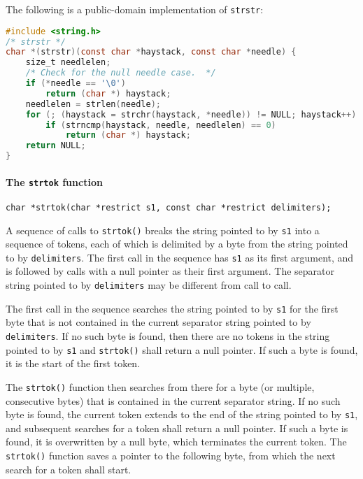 The following is a public-domain implementation of \texttt{strstr}:
\lstset{basicstyle=\scriptsize, numbers=left, captionpos=b, tabsize=4}
\begin{lstlisting}[caption=Section \thesection listing \arabic{stringcnt},language={C},
breaklines=true,xleftmargin=15pt,label=lst:section\thesection listing\arabic{stringcnt}]
#include <string.h>
/* strstr */
char *(strstr)(const char *haystack, const char *needle) {
	size_t needlelen;
	/* Check for the null needle case.  */
	if (*needle == '\0')
		return (char *) haystack;
	needlelen = strlen(needle);
	for (; (haystack = strchr(haystack, *needle)) != NULL; haystack++)
		if (strncmp(haystack, needle, needlelen) == 0)
			return (char *) haystack;
	return NULL;
}
\end{lstlisting}

\paragraph{The \texttt{strtok} function}
\texttt{char *strtok(char *restrict s1, const char *restrict delimiters);}

A sequence of calls to \texttt{strtok()} breaks the string pointed to by
\texttt{s1} into a sequence of tokens, each of which is delimited by a byte
from the string pointed to by \texttt{delimiters}. The first call in the
sequence has \texttt{s1} as its first argument, and is followed by calls with a
null pointer as their first argument. The separator string pointed to by
\texttt{delimiters} may be different from call to call.

The first call in the sequence searches the string pointed to by \texttt{s1}
for the first byte that is not contained in the current separator string
pointed to by \texttt{delimiters}. If no such byte is found, then there are no
tokens in the string pointed to by \texttt{s1} and \texttt{strtok()} shall
return a null pointer. If such a byte is found, it is the start of the first
token.

The \texttt{strtok()} function then searches from there for a byte (or
multiple, consecutive bytes) that is contained in the current separator string.
If no such byte is found, the current token extends to the end of the string
pointed to by \texttt{s1}, and subsequent searches for a token shall return a
null pointer. If such a byte is found, it is overwritten by a null byte, which
terminates the current token. The \texttt{strtok()} function saves a pointer to
the following byte, from which the next search for a token shall start.

